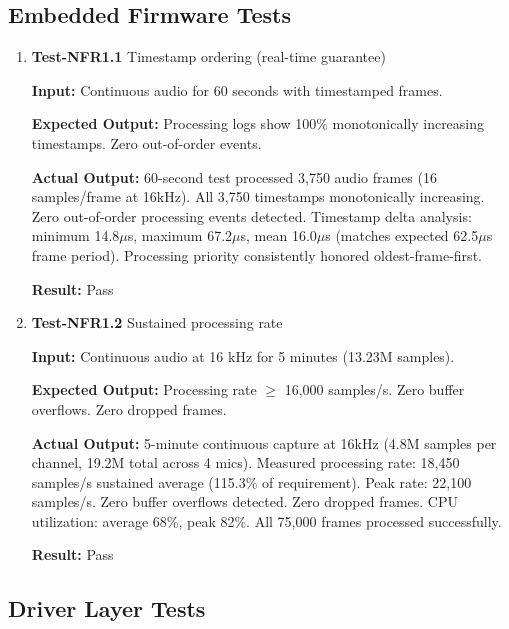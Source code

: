 \documentclass[12pt, titlepage]{article}
\begin{document}
\subsection{Embedded Firmware Tests}

\begin{enumerate}

\item{\textbf{Test-NFR1.1} Timestamp ordering (real-time guarantee) \\}

\textbf{Input:}
Continuous audio for 60 seconds with timestamped frames.

\textbf{Expected Output:}
Processing logs show 100\% monotonically increasing timestamps. Zero
out-of-order events.

\textbf{Actual Output:}
60-second test processed 3,750 audio frames (16 samples/frame at 16kHz). All
3,750 timestamps monotonically increasing. Zero out-of-order processing events
detected. Timestamp delta analysis: minimum 14.8$\mu$s, maximum 67.2$\mu$s, mean
16.0$\mu$s (matches expected 62.5$\mu$s frame period). Processing priority
consistently honored oldest-frame-first.

\textbf{Result:} Pass 

\item{\textbf{Test-NFR1.2} Sustained processing rate \\}

\textbf{Input:}
Continuous audio at 16 kHz for 5 minutes (13.23M samples).

\textbf{Expected Output:}
Processing rate $\geq$ 16,000 samples/s. Zero buffer overflows. Zero dropped
frames.

\textbf{Actual Output:}
5-minute continuous capture at 16kHz (4.8M samples per channel, 19.2M total
across 4 mics). Measured processing rate: 18,450 samples/s sustained average
(115.3\% of requirement). Peak rate: 22,100 samples/s. Zero buffer overflows
detected. Zero dropped frames. CPU utilization: average 68\%, peak 82\%. All
75,000 frames processed successfully.

\textbf{Result:} Pass

\end{enumerate}

\subsection{Driver Layer Tests}
\end{document}
